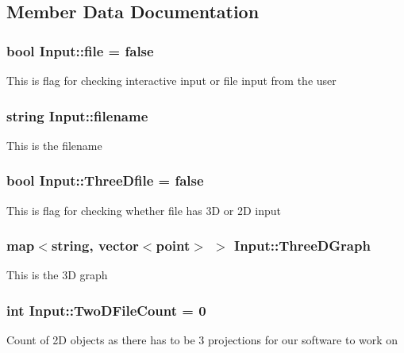 \subsection{Member Data Documentation}
\subsubsection[{\texorpdfstring{file}{file}}]{\setlength{\rightskip}{0pt plus 5cm}bool Input\+::file = false}\hypertarget{classInput_ad073fa115ead2e8b7492214215ebd22d}{}\label{classInput_ad073fa115ead2e8b7492214215ebd22d}
This is flag for checking interactive input or file input from the user 
\subsubsection[{\texorpdfstring{filename}{filename}}]{\setlength{\rightskip}{0pt plus 5cm}string Input\+::filename}\hypertarget{classInput_af296359065236ac9139aab7736d6844d}{}\label{classInput_af296359065236ac9139aab7736d6844d}
This is the filename 
\subsubsection[{\texorpdfstring{Three\+Dfile}{ThreeDfile}}]{\setlength{\rightskip}{0pt plus 5cm}bool Input\+::\+Three\+Dfile = false}\hypertarget{classInput_aacb0e034125e32179081a97eecab47df}{}\label{classInput_aacb0e034125e32179081a97eecab47df}
This is flag for checking whether file has 3D or 2D input 
\subsubsection[{\texorpdfstring{Three\+D\+Graph}{ThreeDGraph}}]{\setlength{\rightskip}{0pt plus 5cm}map$<$string, vector$<${\bf point}$>$ $>$ Input\+::\+Three\+D\+Graph}\hypertarget{classInput_aed882deebbb45d8423e5477e8ccaee60}{}\label{classInput_aed882deebbb45d8423e5477e8ccaee60}
This is the 3D graph 
\subsubsection[{\texorpdfstring{Two\+D\+File\+Count}{TwoDFileCount}}]{\setlength{\rightskip}{0pt plus 5cm}int Input\+::\+Two\+D\+File\+Count = 0}\hypertarget{classInput_a82141fe9142aec447f9ef52fd2f78c73}{}\label{classInput_a82141fe9142aec447f9ef52fd2f78c73}
Count of 2D objects as there has to be 3 projections for our software to work on 

